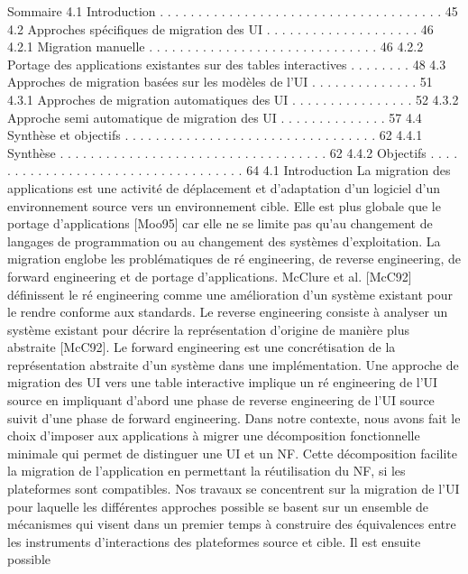 \documentclass{article}
\begin{document}
Sommaire
4.1
Introduction . . . . . . . . . . . . . . . . . . . . . . . . . . . . . . . . . . . . .
45
4.2
Approches sp\'{e}ciﬁques de migration des UI
. . . . . . . . . . . . . . . . . . . .
46
4.2.1
Migration manuelle . . . . . . . . . . . . . . . . . . . . . . . . . . . . . .
46
4.2.2
Portage des applications existantes sur des tables interactives . . . . . . . .
48
4.3
Approches de migration bas\'{e}es sur les mod\`{e}les de l’UI . . . . . . . . . . . . . .
51
4.3.1
Approches de migration automatiques des UI . . . . . . . . . . . . . . . .
52
4.3.2
Approche semi automatique de migration des UI . . . . . . . . . . . . . .
57
4.4
Synth\`{e}se et objectifs . . . . . . . . . . . . . . . . . . . . . . . . . . . . . . . . .
62
4.4.1
Synth\`{e}se
. . . . . . . . . . . . . . . . . . . . . . . . . . . . . . . . . . .
62
4.4.2
Objectifs
. . . . . . . . . . . . . . . . . . . . . . . . . . . . . . . . . . .
64
4.1
Introduction
La migration des applications est une activit\'{e} de d\'{e}placement et d’adaptation d’un logiciel d’un
environnement source vers un environnement cible. Elle est plus globale que le portage d’applications [Moo95] car elle ne se limite pas qu’au changement de langages de programmation ou au changement des syst\`{e}mes d’exploitation. La migration englobe les probl\'{e}matiques de r\'{e} engineering, de
reverse engineering, de forward engineering et de portage d’applications. McClure et al. [McC92]
d\'{e}ﬁnissent le r\'{e} engineering comme une am\'{e}lioration d’un syst\`{e}me existant pour le rendre conforme
aux standards. Le reverse engineering consiste \`{a} analyser un syst\`{e}me existant pour d\'{e}crire la repr\'{e}sentation d’origine de mani\`{e}re plus abstraite [McC92]. Le forward engineering est une concr\'{e}tisation
de la repr\'{e}sentation abstraite d’un syst\`{e}me dans une impl\'{e}mentation. Une approche de migration des
UI vers une table interactive implique un r\'{e} engineering de l’UI source en impliquant d’abord une
phase de reverse engineering de l’UI source suivit d’une phase de forward engineering.
Dans notre contexte, nous avons fait le choix d’imposer aux applications \`{a} migrer une d\'{e}composition fonctionnelle minimale qui permet de distinguer une UI et un NF. Cette d\'{e}composition facilite
la migration de l’application en permettant la r\'{e}utilisation du NF, si les plateformes sont compatibles.
Nos travaux se concentrent sur la migration de l’UI pour laquelle les diff\'{e}rentes approches possible
se basent sur un ensemble de m\'{e}canismes qui visent dans un premier temps \`{a} construire des \'{e}quivalences entre les instruments d’interactions des plateformes source et cible. Il est ensuite possible
\end{document}
